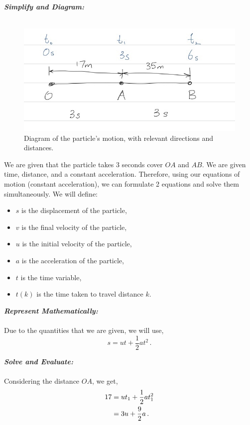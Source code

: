 \begin{subquestions}
\begin{subsubquestions}
\textbf{\textit{Simplify and Diagram:}} \\ \\
\begin{figure}[H]
	\begin{center}
		\includegraphics[scale=0.5]{../2010/figures/2010q5}
		\caption{\label{2010:q5:Move2} Diagram of the particle's motion, with relevant directions and distances.}
	\end{center}
\end{figure}
We are given that the particle takes 3 seconds cover $OA$ and $AB$. We are given time, distance, and a constant acceleration. Therefore, using our equations of motion (constant acceleration), we can formulate 2 equations and solve them simultaneously.
We will define:
\begin{itemize}
	\item $s$ is the displacement of the particle,
	\item $v$ is the final velocity of the particle,
	\item $u$ is the initial velocity of the particle,
	\item $a$ is the acceleration of the particle,
	\item $t$ is the time variable,
	\item $t(k)$ is the time taken to travel distance $k$.
\end{itemize}



\textbf{\textit{Represent Mathematically:}} \\ \\
Due to the quantities that we are given, we will use,
\begin{equation}
	s = ut + \frac{1}{2}at^2 \,.
\end{equation}




\textbf{\textit{Solve and Evaluate:}} \\ \\
Considering the distance $OA$, we get,
\begin{align}
	17 & = ut_1 + \frac{1}{2}at_1^2 \nonumber \\
	& = 3u + \frac{9}{2}a \,. \label{2010:q5:MoveEqn1}
\end{align}


\end{subsubquestions}
\end{subquestions}
